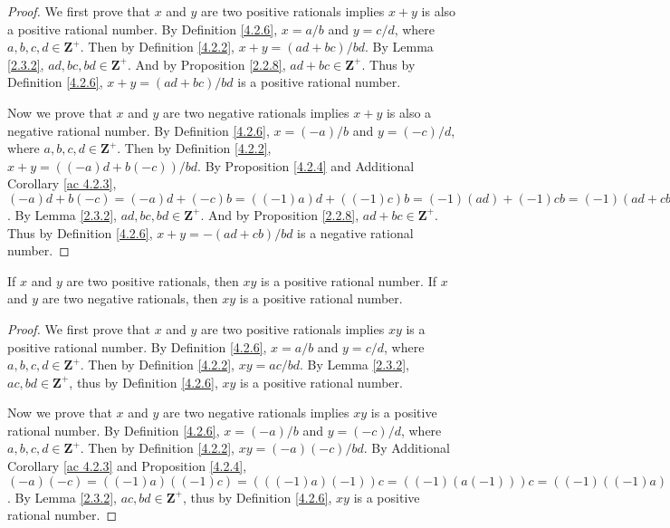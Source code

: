 \begin{proof}
    We first prove that \(x\) and \(y\) are two positive rationals implies \(x + y\) is also a positive rational number.
    By Definition \ref{4.2.6}, \(x = a / b\) and \(y = c / d\), where \(a, b, c, d \in \mathbf{Z}^+\).
    Then by Definition \ref{4.2.2}, \(x + y = (ad + bc) / bd\).
    By Lemma \ref{2.3.2}, \(ad, bc, bd \in \mathbf{Z}^+\).
    And by Proposition \ref{2.2.8}, \(ad + bc \in \mathbf{Z}^+\).
    Thus by Definition \ref{4.2.6}, \(x + y = (ad + bc) / bd\) is a positive rational number.

    Now we prove that \(x\) and \(y\) are two negative rationals implies \(x + y\) is also a negative rational number.
    By Definition \ref{4.2.6}, \(x = (-a) / b\) and \(y = (-c) / d\), where \(a, b, c, d \in \mathbf{Z}^+\).
    Then by Definition \ref{4.2.2}, \(x + y = ((-a)d + b(-c)) / bd\).
    By Proposition \ref{4.2.4} and Additional Corollary \ref{ac 4.2.3}, \((-a)d + b(-c) = (-a)d + (-c)b = ((-1)a)d + ((-1)c)b = (-1)(ad) + (-1)cb = (-1)(ad + cb) = -(ad + cb)\).
    By Lemma \ref{2.3.2}, \(ad, bc, bd \in \mathbf{Z}^+\).
    And by Proposition \ref{2.2.8}, \(ad + bc \in \mathbf{Z}^+\).
    Thus by Definition \ref{4.2.6}, \(x + y = -(ad + cb) / bd\) is a negative rational number.
\end{proof}

\begin{additional corollary}\label{ac 4.2.5}
If \(x\) and \(y\) are two positive rationals, then \(xy\) is a positive rational number.
If \(x\) and \(y\) are two negative rationals, then \(xy\) is a positive rational number.
\end{additional corollary}

\begin{proof}
    We first prove that \(x\) and \(y\) are two positive rationals implies \(xy\) is a positive rational number.
    By Definition \ref{4.2.6}, \(x = a / b\) and \(y = c / d\), where \(a, b, c, d \in \mathbf{Z}^+\).
    Then by Definition \ref{4.2.2}, \(xy = ac / bd\).
    By Lemma \ref{2.3.2}, \(ac, bd \in \mathbf{Z}^+\), thus by Definition \ref{4.2.6}, \(xy\) is a positive rational number.

    Now we prove that \(x\) and \(y\) are two negative rationals implies \(xy\) is a positive rational number.
    By Definition \ref{4.2.6}, \(x = (-a) / b\) and \(y = (-c) / d\), where \(a, b, c, d \in \mathbf{Z}^+\).
    Then by Definition \ref{4.2.2}, \(xy = (-a)(-c) / bd\).
    By Additional Corollary \ref{ac 4.2.3} and Proposition \ref{4.2.4}, \((-a)(-c) = ((-1)a)((-1)c) = (((-1)a)(-1))c = ((-1)(a(-1)))c = ((-1)((-1)a))c = (((-1)(-1))a)c = (1a)c = ac\).
    By Lemma \ref{2.3.2}, \(ac, bd \in \mathbf{Z}^+\), thus by Definition \ref{4.2.6}, \(xy\) is a positive rational number.
\end{proof}

